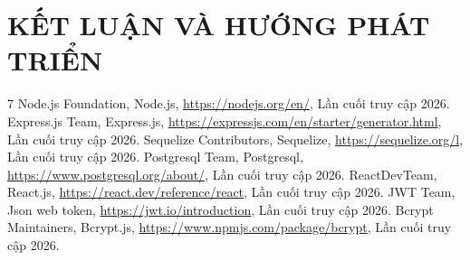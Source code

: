 \documentclass[a4paper,13pt,3p,twoside]{report}
\theoremstyle{definition}
\begin{document}
\chapter{KẾT LUẬN VÀ HƯỚNG PHÁT TRIỂN} %
\label{chapter:conclusion}



% 


\newpage
\renewcommand{\bibname}{TÀI LIỆU THAM KHẢO}
{}
\begin{thebibliography}{7}
 Node.js Foundation, Node.js, \url{https://nodejs.org/en/}, Lần cuối truy cập 2026.
 Express.js Team, Express.js, \url{https://expressjs.com/en/starter/generator.html}, Lần cuối truy cập 2026.
 Sequelize Contributors, Sequelize, \url{https://sequelize.org/l}, Lần cuối truy cập 2026.
 Postgresql Team, Postgresql, \url{https://www.postgresql.org/about/}, Lần cuối truy cập 2026.
 ReactDevTeam, React.js, \url{https://react.dev/reference/react}, Lần cuối truy cập 2026.
 JWT Team, Json web token, \url{https://jwt.io/introduction}, Lần cuối truy cập 2026.
 Bcrypt Maintainers, Bcrypt.js, \url{https://www.npmjs.com/package/bcrypt}, Lần cuối truy cập 2026.
\end{thebibliography}


% 
% 
% 
% 
% 
\end{document}
